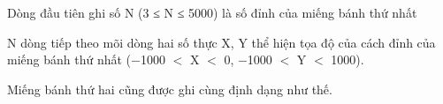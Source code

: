 Dòng đầu tiên ghi số N (3 ≤ N ≤ 5000) là số đỉnh của miếng bánh thứ nhất  

   N dòng tiếp theo mõi dòng hai số thực X, Y thể hiện tọa độ của cách đỉnh của miếng bánh thứ nhất (−1000 $<$ X $<$ 0, −1000 $<$ Y $<$ 1000).  

   Miếng bánh thứ hai cũng được ghi cùng định dạng như thế.